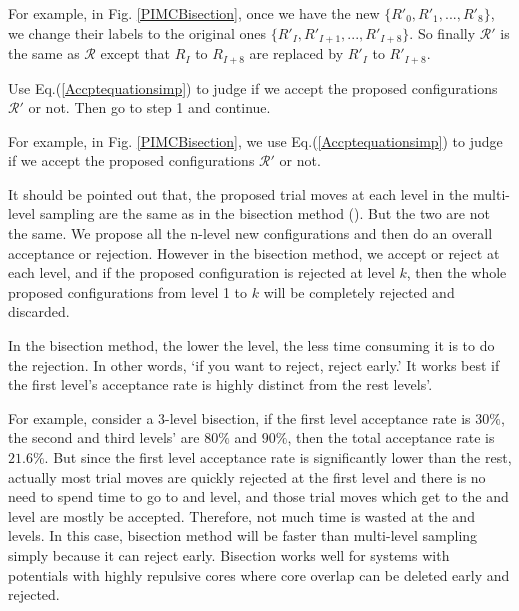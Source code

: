 \documentclass[12pt,letterpaper,UTF8]{report}
\begin{document}
\begin{description}
    For example, in Fig. \ref{PIMCBisection}, once we have the new $\{R'_0, R'_1, ..., R'_{8} \}$, we change their labels to the original ones $\{R'_I, R'_{I+1}, ..., R'_{I+8} \}$. So finally $\mathcal{R}'$ is the same as $\mathcal{R}$ except that $R_I$ to $R_{I+8}$ are replaced by $R'_I$ to $R'_{I+8}$.

  \item[Step 5] Use Eq.(\ref{Accptequationsimp}) to judge if we accept the proposed configurations $\mathcal{R}'$ or not. Then go to step 1 and continue.

      For example, in Fig. \ref{PIMCBisection}, we use Eq.(\ref{Accptequationsimp}) to judge if we accept the proposed configurations $\mathcal{R}'$ or not.

\end{description}



It should be pointed out that, the proposed trial moves at each level in the multi-level sampling are the same as in the bisection method (\cite{Ceperley95a}).
But the two are not the same.
We propose all the n-level new configurations and then do an overall acceptance or rejection.
However in the bisection method, we accept or reject at each level, and if the proposed configuration is rejected at level $k$, then the whole proposed configurations from level 1 to $k$ will be completely rejected and discarded.

In the bisection method, the lower the level, the less time consuming it is to do the rejection.
In other words, `if you want to reject, reject early.'
It works best if the first level's acceptance rate is highly distinct from the rest levels'.

For example, consider a 3-level bisection, if the first level acceptance rate is $30\%$, the second and third levels' are $80\%$ and $90\%$, then the total acceptance rate is $21.6\%$.
But since the first level acceptance rate is significantly lower than the rest,
actually most trial moves are quickly rejected at the first level and there is no need to spend time to go to  and  level,
and those trial moves which get to the  and  level are mostly be accepted.
Therefore, not much time is wasted at the  and  levels.
In this case, bisection method will be faster than multi-level sampling simply because it can reject early.
Bisection works well for systems with potentials with highly repulsive cores where core overlap can be deleted early and rejected.
\end{document}
